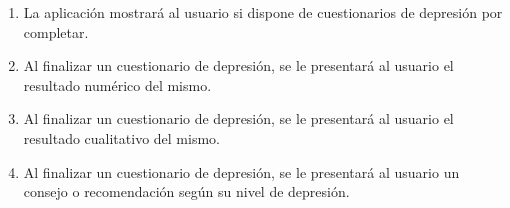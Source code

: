 \begin{enumerate}[resume=req-usuario,label=\textbf{\texttt{RU-\arabic*}}]
\begin{enumerate}[resume=req-funcionales,label=\textbf{\texttt{RF-\arabic*}}]
                \item \label{req:funcionales:depresion_cuestionario_pendientes} La aplicación mostrará al usuario si dispone de cuestionarios de depresión por completar.
                \item \label{req:funcionales:depresion_cuestionario_numero} Al finalizar un cuestionario de depresión, se le presentará al usuario el resultado numérico del mismo.
                \item \label{req:funcionales:depresion_cuestionario_categoria} Al finalizar un cuestionario de depresión, se le presentará al usuario el resultado cualitativo del mismo.
                \item \label{req:funcionales:depresion_cuestionario_consejo} Al finalizar un cuestionario de depresión, se le presentará al usuario un consejo o recomendación según su nivel de depresión.
            \end{enumerate}
        \end{enumerate}
